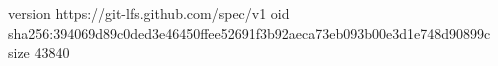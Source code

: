 version https://git-lfs.github.com/spec/v1
oid sha256:394069d89c0ded3e46450ffee52691f3b92aeca73eb093b00e3d1e748d90899c
size 43840
